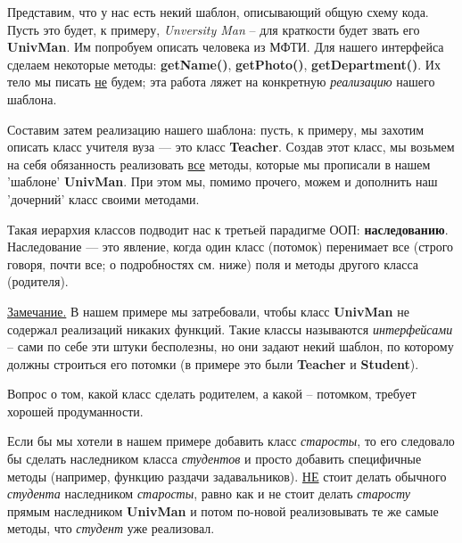 \begin{lecture}[\lectureSubject]
	\begin{lecSection}
		Представим, что у нас есть некий шаблон, описывающий общую схему кода. Пусть это будет, к примеру, \textit{Unversity Man} -- для краткости будет звать его \textbf{UnivMan}. Им попробуем описать человека из МФТИ. Для нашего интерфейса сделаем некоторые методы: \textbf{getName()}, \textbf{getPhoto()}, \textbf{getDepartment()}. Их тело мы писать \underline{не} будем; эта работа ляжет на конкретную \textit{реализацию} нашего шаблона.
		
		Составим затем реализацию нашего шаблона: пусть, к примеру, мы захотим описать класс учителя вуза --- это класс \textbf{Teacher}. Создав этот класс, мы возьмем на себя обязанность реализовать \underline{все} методы, которые мы прописали в нашем 'шаблоне' \textbf{UnivMan}. При этом мы, помимо прочего, можем и дополнить наш 'дочерний' класс своими методами.
		
	\end{lecSection}
	\begin{lecSection}
		Такая иерархия классов подводит нас к третьей парадигме ООП: \textbf{наследованию}. Наследование --- это явление, когда один класс (потомок) перенимает все (строго говоря, почти все; о подробностях см. ниже) поля и методы другого класса (родителя).
		
		\underline{Замечание.} В нашем примере мы затребовали, чтобы класс \textbf{UnivMan} не содержал реализаций никаких функций. Такие классы называются \textit{интерфейсами} -- сами по себе эти штуки бесполезны, но они задают некий шаблон, по которому должны строиться его потомки (в примере это были \textbf{Teacher} и \textbf{Student}).
	\end{lecSection}
	\begin{lecSection}
		Вопрос о том, какой класс сделать родителем, а какой -- потомком, требует хорошей продуманности.
		
		Если бы мы хотели в нашем примере добавить класс \textit{старосты}, то его следовало бы сделать наследником класса \textit{студентов} и просто добавить специфичные методы (например, функцию раздачи задавальников). \underline{НЕ} стоит делать обычного \textit{студента} наследником \textit{старосты}, равно как и не стоит делать \textit{старосту} прямым наследником \textbf{UnivMan} и потом по-новой реализовывать те же самые методы, что \textit{студент} уже реализовал.
		

\end{lecSection}
\end{lecture}
